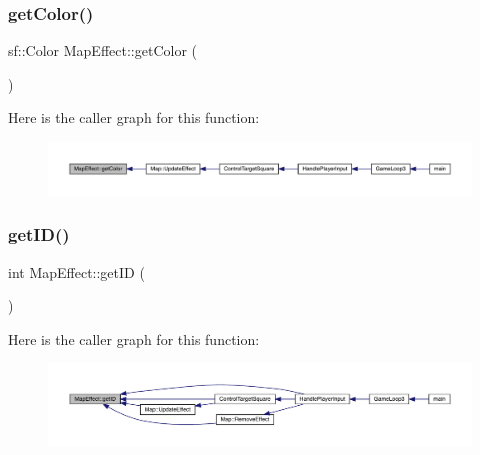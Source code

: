 \mbox{\label{class_map_effect_a8c3e266da325516b48983cf7cf238cf6}} 
\subsubsection{\texorpdfstring{get\+Color()}{getColor()}}
{\footnotesize\ttfamily sf\+::\+Color Map\+Effect\+::get\+Color (\begin{DoxyParamCaption}{ }\end{DoxyParamCaption})}

Here is the caller graph for this function\+:\nopagebreak
\begin{figure}[H]
\begin{center}
\leavevmode
\includegraphics[width=350pt]{de/de4/class_map_effect_a8c3e266da325516b48983cf7cf238cf6_icgraph}
\end{center}
\end{figure}
\mbox{\label{class_map_effect_af05848201790b0038c5b61659b116706}} 
\subsubsection{\texorpdfstring{get\+I\+D()}{getID()}}
{\footnotesize\ttfamily int Map\+Effect\+::get\+ID (\begin{DoxyParamCaption}{ }\end{DoxyParamCaption})}

Here is the caller graph for this function\+:\nopagebreak
\begin{figure}[H]
\begin{center}
\leavevmode
\includegraphics[width=350pt]{de/de4/class_map_effect_af05848201790b0038c5b61659b116706_icgraph}
\end{center}
\end{figure}
\mbox{\label{class_map_effect_a7aeebd5eef57c00feabca583a38c5361}} 
